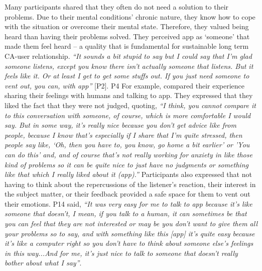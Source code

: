             Many participants shared that they often do not need a solution to their problems. Due to their mental conditions' chronic nature, they know how to cope with the situation or overcome their mental state. Therefore, they valued being heard than having their problems solved. They perceived \acl{app} as `someone' that made them feel heard -- a quality that is fundamental for sustainable long term \ac{CA}-user relationship.
                \textit{``It sounds a bit stupid to say but I could say that I'm glad someone listens, except you know there isn't actually someone that listens. But it feels like it. Or at least I get to get some stuffs out. If you just need someone to vent out, you can, with \acl{app}''} [P2].
            P4 For example, compared their experience sharing their feelings with humans and talking to \acl{app}. They expressed that they liked the fact that they were not judged, quoting,
                \textit{``I think, you cannot compare it to this conversation with someone, of course, which is more comfortable I would say. But in some way, it's really nice because you don't get advice like from people, because I know that's especially if I share that I'm quite stressed, then people say like, `Oh, then you have to, you know, go home a bit earlier' or 'You can do this' and, and of course that's not really working for anxiety in like those kind of problems so it can be quite nice to just have no judgments or something like that which I really liked about it (\acl{app}).''}
            Participants also expressed that not having to think about the repercussions of the listener's reaction, their interest in the subject matter, or their feedback provided a safe space for them to vent out their emotions. P14 said,
                \textit{``It was very easy for me to talk to \acl{app} because it's like someone that doesn't, I mean, if you talk to a human, it can sometimes be that you can feel that they are not interested or may be you don't want to give them all your problems so to say, and with something like this [\acl{app}] it's quite easy because it's like a computer right so you don't have to think about someone else's feelings in this way...And for me, it's just nice to talk to someone that doesn't really bother about what I say''}.



